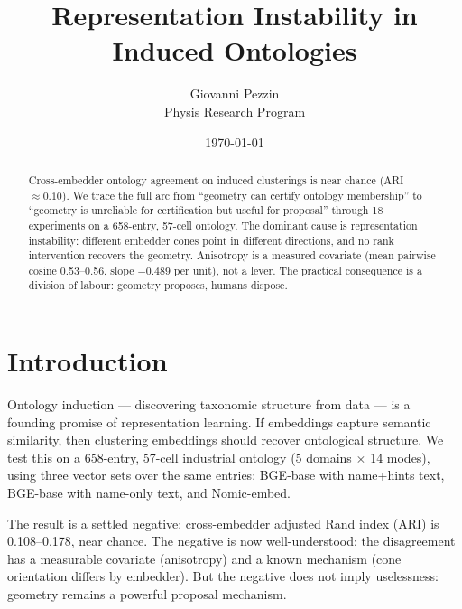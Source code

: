 \documentclass[11pt]{article}
\title{Representation Instability in Induced Ontologies}
\author{Giovanni Pezzin \\ Physis Research Program}
\date{\today}
\begin{document}
\maketitle

\begin{center}
\end{center}

\begin{abstract}
Cross-embedder ontology agreement on induced clusterings is near chance
(ARI $\approx 0.10$). We trace the full arc from ``geometry can certify
ontology membership'' to ``geometry is unreliable for certification but
useful for proposal'' through 18 experiments on a 658-entry, 57-cell
ontology. The dominant cause is representation instability: different
embedder cones point in different directions, and no rank intervention
recovers the geometry. Anisotropy is a measured covariate (mean pairwise
cosine 0.53--0.56, slope $-0.489$ per unit), not a lever. The practical
consequence is a division of labour: geometry proposes, humans dispose.
\end{abstract}

\section{Introduction}

Ontology induction --- discovering taxonomic structure from data --- is a
founding promise of representation learning. If embeddings capture
semantic similarity, then clustering embeddings should recover ontological
structure. We test this on a 658-entry, 57-cell industrial ontology
(5 domains $\times$ 14 modes), using three vector sets over the same
entries: BGE-base with name+hints text, BGE-base with name-only text, and
Nomic-embed.

The result is a settled negative: cross-embedder adjusted Rand index (ARI)
is 0.108--0.178, near chance. The negative is now well-understood: the
disagreement has a measurable covariate (anisotropy) and a known mechanism
(cone orientation differs by embedder). But the negative does not imply
uselessness: geometry remains a powerful proposal mechanism.
\end{document}
